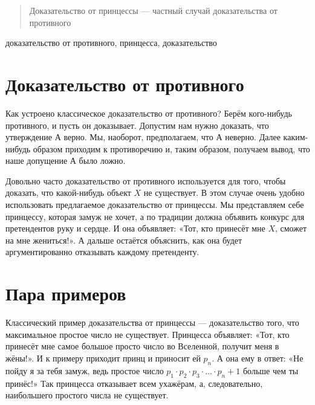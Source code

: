 \documentclass[10pt]{article}
\begin{document}


\DoFirstPageTechnicalStuff


\newtheorem{theorem}{Теорема}
\newtheorem{definition}{Определение}

\begin{abstract}
Доказательство от принцессы --- частный случай доказательства от противного
\end{abstract}

\begin{keyword}
доказательство от противного, принцесса, доказательство
\end{keyword}



\section{Доказательство от противного}

Как устроено классическое доказательство от противного? Берём кого-нибудь противного, и пусть он доказывает. Допустим нам нужно доказать, что утверждение А верно. Мы, наоборот, предполагаем, что А неверно. Далее каким-нибудь образом приходим к противоречию и, таким образом, получаем вывод, что наше допущение А было ложно. 

Довольно часто доказательство от противного используется для того, чтобы доказать, что какой-нибудь объект $X$ не существует. В этом случае очень удобно использовать предлагаемое доказательство от принцессы. Мы представляем себе принцессу, которая замуж не хочет, а по традиции должна объявить конкурс для претендентов руку и сердце. И она объявляет: «Тот, кто принесёт мне $X$, сможет на мне жениться!». А дальше остаётся объяснить, как она будет аргументированно отказывать каждому претенденту.

\section{Пара примеров}

Классический пример доказательства от принцессы --- доказательство того, что максимальное простое число не существует. Принцесса объявляет: «Тот, кто принесёт мне самое большое просто число во Вселенной, получит меня в жёны!». И к примеру приходит принц и приносит ей $p_n$. А она ему в ответ: «Не пойду я за тебя замуж, ведь простое число 
$p_1 \cdot p_2 \cdot p_3 \cdot \ldots \cdot p_n + 1$
больше чем ты принёс!» Так принцесса отказывает всем ухажёрам, а, следовательно, наибольшего простого числа не существует.
\end{document}
